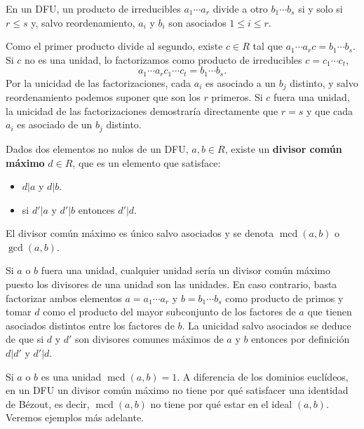 
En un DFU, un producto de irreducibles \(a_1\cdots a_r\) divide a otro
\(b_1\cdots b_s\) si y solo si \(r\leq s\) y, salvo reordenamiento,
\(a_i\) y \(b_i\) son asociados \(1\leq i\leq r\). 


Como el primer producto divide al segundo, existe \(c\in R\) tal que
\(a_1\cdots a_rc=b_1\cdots b_s\). Si \(c\) no es una unidad, lo
factorizamos como producto de irreducibles \(c=c_1\cdots c_t\),
\[a_1\cdots a_rc_1\cdots c_t=b_1\cdots b_s.\] Por la unicidad de las
factorizaciones, cada \(a_i\) es asociado a un \(b_j\) distinto, y salvo
reordenamiento podemos suponer que son los \(r\) primeros. Si \(c\)
fuera una unidad, la unicidad de las factorizaciones demostraría
directamente que \(r=s\) y que cada \(a_i\) es asociado de un \(b_j\)
distinto. 


Dados dos elementos no nulos de un DFU, \(a,b\in R\), existe un
\textbf{divisor común máximo} \(d\in R\), que es un elemento que
satisface:

\begin{itemize}
\item
  \(d|a\) y \(d|b\).
\item
  si \(d'|a\) y \(d'|b\) entonces \(d'|d\).
\end{itemize}

El divisor común máximo es único salvo asociados y se denota
\(\operatorname{mcd}(a,b)\) o \(\gcd(a,b)\). 


Si \(a\) o \(b\) fuera una unidad, cualquier unidad sería un divisor
común máximo puesto los divisores de una unidad son las unidades. En
caso contrario, basta factorizar ambos elementos \(a=a_1\cdots a_r\) y
\(b=b_1\cdots b_s\) como producto de primos y tomar \(d\) como el
producto del mayor subconjunto de los factores de \(a\) que tienen
asociados distintos entre los factores de \(b\). La unicidad salvo
asociados se deduce de que si \(d\) y \(d'\) son divisores comunes
máximos de \(a\) y \(b\) entonces por definición \(d|d'\) y \(d'|d\).


Si \(a\) o \(b\) es una unidad \(\operatorname{mcd}(a,b)=1\). A
diferencia de los dominios euclídeos, en un DFU un divisor común máximo
no tiene por qué satisfacer una identidad de Bézout, es decir,
\(\operatorname{mcd}(a,b)\) no tiene por qué estar en el ideal
\((a,b)\). Veremos ejemplos más adelante. 

